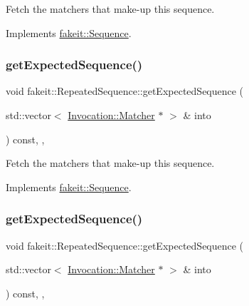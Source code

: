 Fetch the matchers that make-\/up this sequence. 



Implements \mbox{\hyperlink{classfakeit_1_1Sequence_aa1a1e4ad2fcac3379ba38f250bf06884}{fakeit\+::\+Sequence}}.

\mbox{\label{classfakeit_1_1RepeatedSequence_a65b5f62fe0ba9da31b99f28c1a2e53f2}} 
\subsubsection{\texorpdfstring{getExpectedSequence()}{getExpectedSequence()}\hspace{0.1cm}{\footnotesize\ttfamily [6/9]}}
{\footnotesize\ttfamily void fakeit\+::\+Repeated\+Sequence\+::get\+Expected\+Sequence (\begin{DoxyParamCaption}\item[{std\+::vector$<$ \mbox{\hyperlink{structfakeit_1_1Invocation_1_1Matcher}{Invocation\+::\+Matcher}} $\ast$ $>$ \&}]{into }\end{DoxyParamCaption}) const\hspace{0.3cm}{\ttfamily [inline]}, {\ttfamily [override]}, {\ttfamily [virtual]}}



Fetch the matchers that make-\/up this sequence. 



Implements \mbox{\hyperlink{classfakeit_1_1Sequence_aa1a1e4ad2fcac3379ba38f250bf06884}{fakeit\+::\+Sequence}}.

\mbox{\label{classfakeit_1_1RepeatedSequence_a65b5f62fe0ba9da31b99f28c1a2e53f2}} 
\subsubsection{\texorpdfstring{getExpectedSequence()}{getExpectedSequence()}\hspace{0.1cm}{\footnotesize\ttfamily [7/9]}}
{\footnotesize\ttfamily void fakeit\+::\+Repeated\+Sequence\+::get\+Expected\+Sequence (\begin{DoxyParamCaption}\item[{std\+::vector$<$ \mbox{\hyperlink{structfakeit_1_1Invocation_1_1Matcher}{Invocation\+::\+Matcher}} $\ast$ $>$ \&}]{into }\end{DoxyParamCaption}) const\hspace{0.3cm}{\ttfamily [inline]}, {\ttfamily [override]}, {\ttfamily [virtual]}}




